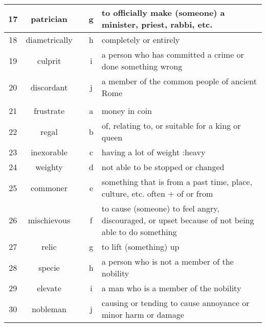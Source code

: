 \documentclass[a4paper]{article}
\begin{document}
\begin{center}
\begin{tabular}{|c|c|c|c|m{}|}
\hline
 17 & patrician & & g &  to officially make (someone) a minister, priest, rabbi, etc. \\
\hline
 18 & diametrically & & h &  completely or entirely \\
\hline
 19 & culprit & & i &  a person who has committed a crime or done something wrong \\
\hline
 20 & discordant & & j &  a member of the common people of ancient Rome\\
\hline
 & & & & \\
\hline
 21 & frustrate & & a &  money in coin\\
\hline
 22 & regal & & b &  of, relating to, or suitable for a king or queen \\
\hline
 23 & inexorable & & c &  having a lot of weight :heavy \\
\hline
 24 & weighty & & d &  not able to be stopped or changed \\
\hline
 25 & commoner & & e &  something that is from a past time, place, culture, etc. often + of or from \\
\hline
 26 & mischievous & & f &  to cause (someone) to feel angry, discouraged, or upset because of not being able to do something \\
\hline
 27 & relic & & g &  to lift (something) up \\
\hline
 28 & specie & & h &  a person who is not a member of the nobility \\
\hline
 29 & elevate & & i &  a man who is a member of the nobility\\
\hline
 30 & nobleman & & j &  causing or tending to cause annoyance or minor harm or damage \\
\hline
\end{tabular}
\end{center}
\end{document}
